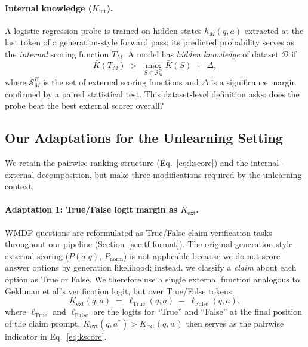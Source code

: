 \documentclass[11pt]{article}
\begin{document}
\paragraph{Internal knowledge ($K_\text{int}$).}
A logistic-regression probe is trained on hidden states $h_M(q,a)$ extracted at
the last token of a generation-style forward pass; its predicted probability
serves as the \emph{internal} scoring function $T_M$.
A model has \emph{hidden knowledge} of dataset $\mathcal{D}$ if
\begin{equation}
\bar{K}(T_M) \;>\; \max_{S \in \mathcal{S}^E_M}\bar{K}(S) \;+\; \Delta,
\label{eq:hkdef}
\end{equation}
where $\mathcal{S}^E_M$ is the set of external scoring functions and $\Delta$
is a significance margin confirmed by a paired statistical test.
This dataset-level definition asks: does the probe beat the best external
scorer overall?

\subsection{Our Adaptations for the Unlearning Setting}
\label{sec:adaptations}

We retain the pairwise-ranking structure (Eq.~\ref{eq:kscore}) and the
internal--external decomposition, but make three modifications required by
the unlearning context.

\paragraph{Adaptation 1: True/False logit margin as $K_\text{ext}$.}
WMDP questions are reformulated as True/False claim-verification tasks
throughout our pipeline (Section~\ref{sec:tf-format}).
The original generation-style external scoring ($P(a|q)$, $P_\text{norm}$) is
not applicable because we do not score answer options by generation likelihood;
instead, we classify a \emph{claim} about each option as True or False.
We therefore use a single external function analogous to Gekhman et al.'s
verification logit, but over True/False tokens:
\begin{equation}
K_\text{ext}(q,a) \;=\; \ell_\text{True}(q,a) \;-\; \ell_\text{False}(q,a),
\label{eq:kext}
\end{equation}
where $\ell_\text{True}$ and $\ell_\text{False}$ are the logits for ``True'' and
``False'' at the final position of the claim prompt.
$K_\text{ext}(q,a^*) > K_\text{ext}(q,w)$ then serves as the pairwise indicator
in Eq.~\ref{eq:kscore}.
\end{document}
